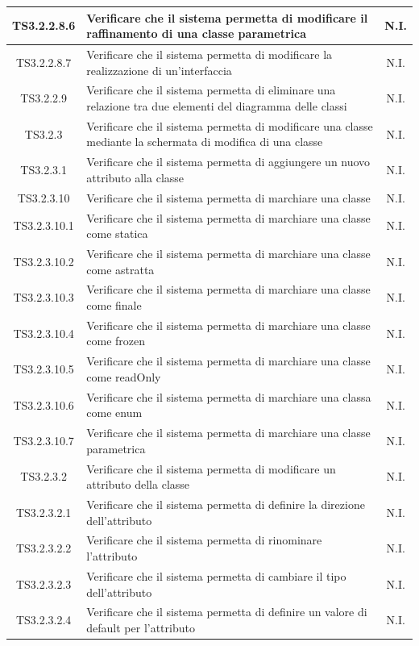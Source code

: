 \documentclass[../PianoDiQualifica.tex]{subfiles}
\begin{document}
\begin{longtable}{|c|>{\centering}p{10cm}|c|}
	\hline
	TS3.2.2.8.6 & Verificare che il sistema permetta di modificare il raffinamento di una classe parametrica & N.I. \\
	\hline
	TS3.2.2.8.7 & Verificare che il sistema permetta di modificare la realizzazione di un'interfaccia & N.I. \\
	\hline
	TS3.2.2.9 & Verificare che il sistema permetta di eliminare una relazione tra due elementi del diagramma delle classi & N.I. \\
	\hline
	TS3.2.3 & Verificare che il sistema permetta di modificare una classe mediante la schermata di modifica di una classe & N.I. \\
	\hline
	TS3.2.3.1 & Verificare che il sistema permetta di aggiungere un nuovo attributo alla classe & N.I. \\
	\hline
	TS3.2.3.10 & Verificare che il sistema permetta di marchiare una classe & N.I. \\
	\hline
	TS3.2.3.10.1 & Verificare che il sistema permetta di marchiare una classe come statica & N.I. \\
	\hline
	TS3.2.3.10.2 & Verificare che il sistema permetta di marchiare una classe come astratta & N.I. \\
	\hline
	TS3.2.3.10.3 & Verificare che il sistema permetta di marchiare una classe come finale & N.I. \\
	\hline
	TS3.2.3.10.4 & Verificare che il sistema permetta di marchiare una classe come frozen & N.I. \\
	\hline
	TS3.2.3.10.5 & Verificare che il sistema permetta di marchiare una classe come readOnly & N.I. \\
	\hline
	TS3.2.3.10.6 & Verificare che il sistema permetta di marchiare una classa come enum & N.I. \\
	\hline
	TS3.2.3.10.7 & Verificare che il sistema permetta di marchiare una classe parametrica & N.I. \\
	\hline
	TS3.2.3.2 & Verificare che il sistema permetta di modificare un attributo della classe & N.I. \\
	\hline
	TS3.2.3.2.1 & Verificare che il sistema permetta di definire la direzione dell'attributo & N.I. \\
	\hline
	TS3.2.3.2.2 & Verificare che il sistema permetta di rinominare l'attributo & N.I. \\
	\hline
	TS3.2.3.2.3 & Verificare che il sistema permetta di cambiare il tipo dell'attributo & N.I. \\
	\hline
	TS3.2.3.2.4 & Verificare che il sistema permetta di definire un valore di default per l'attributo & N.I. \\

\end{longtable}
\end{document}

